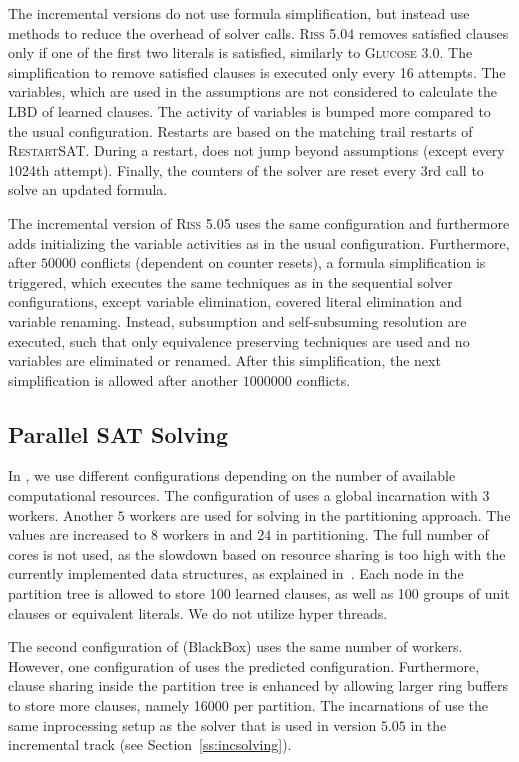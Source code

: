 \documentclass[conference]{IEEEtran}
\begin{document}
The incremental versions do not use formula simplification, but instead use methods to reduce the overhead of solver calls. 
\textsc{Riss 5.04} removes satisfied clauses only if one of the first two literals is satisfied, similarly to \textsc{Glucose 3.0}. 
The simplification to remove satisfied clauses is executed only every 16 attempts. 
The variables, which are used in the assumptions are not considered to calculate the LBD of learned clauses. 
The activity of variables is bumped more compared to the usual configuration. 
Restarts are based on the matching trail restarts of \textsc{RestartSAT}. 
During a restart, \riss does not jump beyond assumptions (except every 1024th attempt). 
Finally, the counters of the solver are reset every $3$rd call to solve an updated formula. 

The incremental version of \textsc{Riss 5.05} uses the same configuration and furthermore adds initializing the variable activities as in the usual configuration. 
Furthermore, after $50000$ conflicts (dependent on counter resets), a formula simplification is triggered, which executes the same techniques as in the sequential solver configurations, except variable elimination, covered literal elimination and variable renaming. 
Instead, subsumption and self-subsuming resolution are executed, such that only equivalence preserving techniques are used and no variables are eliminated or renamed. 
After this simplification, the next simplification is allowed after another $1000000$ conflicts.


\subsection{Parallel SAT Solving}


In \pcasso, we use different configurations depending on the number of available computational resources. 
The configuration of \pcasso uses a global \priss incarnation with $3$ workers. 
Another $5$ workers are used for solving in the partitioning approach. 
The values are increased to $8$ workers in \priss and $24$ in partitioning. 
The full number of cores is not used, as the slowdown based on resource sharing is too high with the currently implemented data structures, as explained in~\cite{portfolioSlowdown}. 
Each node in the partition tree is allowed to store 100 learned clauses, as well as 100 groups of unit clauses or equivalent literals. 
We do not utilize hyper threads. 

The second configuration of \pcasso (BlackBox) uses the same number of workers. 
However, one configuration of \priss uses the predicted configuration. 
Furthermore, clause sharing inside the partition tree is enhanced by allowing larger ring buffers to store more clauses, namely 16000 per partition. 
The incarnations of \riss use the same inprocessing setup as the solver that is used in version $5.05$ in the incremental track (see Section~\ref{ss:incsolving}).
\end{document}
